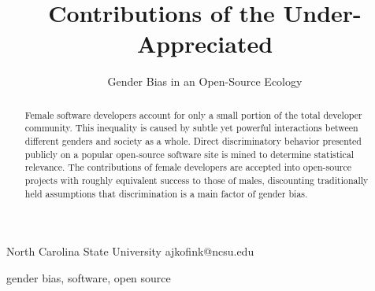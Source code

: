 \documentclass{sigplanconf}
\begin{document}
\setlength{\pdfpageheight}{\paperheight}
\setlength{\pdfpagewidth}{\paperwidth}






\title{Contributions of the Under-Appreciated}
\subtitle{Gender Bias in an Open-Source Ecology}

           {North Carolina State University}
           {ajkofink@ncsu.edu}

\maketitle

\begin{abstract}
  Female software developers account for only a small portion of the total
  developer community. This inequality is caused by subtle yet powerful
  interactions between different genders and society as a whole. Direct
  discriminatory behavior presented publicly on a popular open-source software site is
  mined to determine statistical relevance. The contributions of female developers
  are accepted into open-source projects with roughly equivalent success to
  those of males, discounting traditionally held assumptions that discrimination
  is a main factor of gender bias.
\end{abstract}



\keywords
gender bias, software, open source
\end{document}
